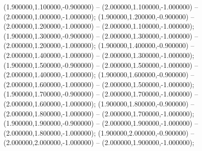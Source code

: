  (1.900000,1.100000,-0.900000) -- (2.000000,1.100000,-1.000000) -- (2.000000,1.000000,-1.000000);
 (1.900000,1.200000,-0.900000) -- (2.000000,1.200000,-1.000000) -- (2.000000,1.100000,-1.000000);
 (1.900000,1.300000,-0.900000) -- (2.000000,1.300000,-1.000000) -- (2.000000,1.200000,-1.000000);
 (1.900000,1.400000,-0.900000) -- (2.000000,1.400000,-1.000000) -- (2.000000,1.300000,-1.000000);
 (1.900000,1.500000,-0.900000) -- (2.000000,1.500000,-1.000000) -- (2.000000,1.400000,-1.000000);
 (1.900000,1.600000,-0.900000) -- (2.000000,1.600000,-1.000000) -- (2.000000,1.500000,-1.000000);
 (1.900000,1.700000,-0.900000) -- (2.000000,1.700000,-1.000000) -- (2.000000,1.600000,-1.000000);
 (1.900000,1.800000,-0.900000) -- (2.000000,1.800000,-1.000000) -- (2.000000,1.700000,-1.000000);
 (1.900000,1.900000,-0.900000) -- (2.000000,1.900000,-1.000000) -- (2.000000,1.800000,-1.000000);
 (1.900000,2.000000,-0.900000) -- (2.000000,2.000000,-1.000000) -- (2.000000,1.900000,-1.000000);
